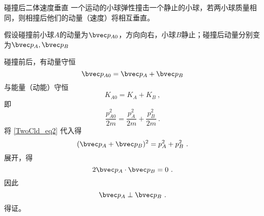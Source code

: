 \begin{example}{碰撞后二体速度垂直}
一个运动的小球弹性撞击一个静止的小球，若两小球质量相同，则相撞后他们的动量（速度）将相互垂直。

假设碰撞前小球$A$的动量为$\bvec p_{A0}$，方向向右，小球$B$静止；碰撞后动量分别变为$\bvec p_{A},\bvec p_{B}$

碰撞前后，有动量守恒
\begin{equation}\label{TwoCld_eq2}
\bvec p_{A0} = \bvec p_{A} + \bvec p_{B}
\end{equation}
与能量（动能）守恒
\begin{equation}
K_{A0} = K_{A} + K_{B}~,
\end{equation}
即
\begin{equation}
\frac{p_{A0}^2}{2m}=\frac{p_{A}^2}{2m}+\frac{p_{B}^2}{2m}~.
\end{equation}
将 \autoref{TwoCld_eq2} 代入得
\begin{equation}
(\bvec p_{A} + \bvec p_{B})^2=p_{A}^2+p_{B}^2~.
\end{equation}
展开，得
\begin{equation}
2\bvec p_{A} \cdot \bvec p_{B}=0~.
\end{equation}
因此
\begin{equation}
\bvec p_{A} \perp \bvec p_{B}~.
\end{equation}
得证。
\end{example}



